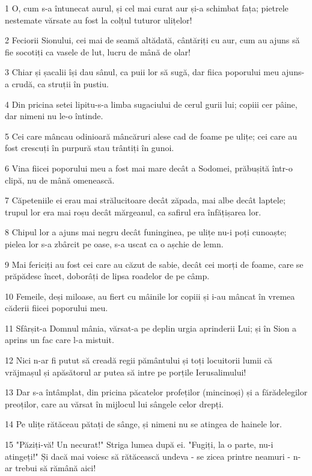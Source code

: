 \par 1 O, cum s-a întunecat aurul, și cel mai curat aur și-a schimbat fața; pietrele nestemate vărsate au fost la colțul tuturor ulițelor!
\par 2 Feciorii Sionului, cei mai de seamă altădată, cântăriți cu aur, cum au ajuns să fie socotiți ca vasele de lut, lucru de mână de olar!
\par 3 Chiar și șacalii își dau sânul, ca puii lor să sugă, dar fiica poporului meu ajuns-a crudă, ca struții în pustiu.
\par 4 Din pricina setei lipitu-s-a limba sugaciului de cerul gurii lui; copiii cer pâine, dar nimeni nu le-o întinde.
\par 5 Cei care mâncau odinioară mâncăruri alese cad de foame pe ulițe; cei care au fost crescuți în purpură stau trântiți în gunoi.
\par 6 Vina fiicei poporului meu a fost mai mare decât a Sodomei, prăbușită într-o clipă, nu de mână omenească.
\par 7 Căpeteniile ei erau mai strălucitoare decât zăpada, mai albe decât laptele; trupul lor era mai roșu decât mărgeanul, ca safirul era înfățișarea lor.
\par 8 Chipul lor a ajuns mai negru decât funinginea, pe ulițe nu-i poți cunoaște; pielea lor s-a zbârcit pe oase, s-a uscat ca o așchie de lemn.
\par 9 Mai fericiți au fost cei care au căzut de sabie, decât cei morți de foame, care se prăpădesc încet, doborâți de lipsa roadelor de pe câmp.
\par 10 Femeile, deși miloase, au fiert cu mâinile lor copiii și i-au mâncat în vremea căderii fiicei poporului meu.
\par 11 Sfârșit-a Domnul mânia, vărsat-a pe deplin urgia aprinderii Lui; și în Sion a aprins un fac care l-a mistuit.
\par 12 Nici n-ar fi putut să creadă regii pământului și toți locuitorii lumii că vrăjmașul și apăsătorul ar putea să intre pe porțile Ierusalimului!
\par 13 Dar s-a întâmplat, din pricina păcatelor profeților (mincinoși) și a fărădelegilor preoților, care au vărsat în mijlocul lui sângele celor drepți.
\par 14 Pe ulițe rătăceau pătați de sânge, și nimeni nu se atingea de hainele lor.
\par 15 "Păziți-vă! Un necurat!" Striga lumea după ei. "Fugiți, la o parte, nu-i atingeți!" Și dacă mai voiesc să rătăcească undeva - se zicea printre neamuri - n-ar trebui să rămână aici!
